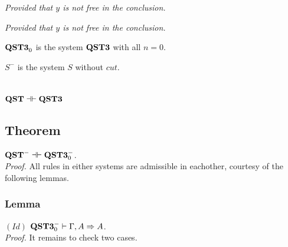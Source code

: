 \documentclass[a4paper, 12pt]{paper}
\begin{document}
\begin{multicols}{2}
  \begin{prooftree}
  \end{prooftree}
  \columnbreak
  \begin{prooftree}
  \end{prooftree}
  \center
  \emph{Provided that $y$ is not free in the conclusion.}
\end{multicols}\vspace*{1em}
\begin{multicols}{2}
  \begin{prooftree}
  \end{prooftree}
  \center
  \emph{Provided that $y$ is not free in the conclusion.}
  \columnbreak
  \begin{prooftree}
  \end{prooftree}
\end{multicols}

$\qstt_0$ is the system $\qstt$ with all $n = 0$.

$S^-$ is the system $S$ without $cut$.

\section{$\qst \dashv \vdash \qstt$}

\subsection{Theorem} $\qst^- \dashv \vdash \qstt_0^-$.\\
\emph{Proof.} All rules in either systems are admissible in eachother, courtesy of the following lemmas.

\subsubsection{Lemma} $(Id)$ $\qstt_0^- \vdash \Gamma, A \Rightarrow A$.\\
\emph{Proof.} It remains to check two cases.
\end{document}
